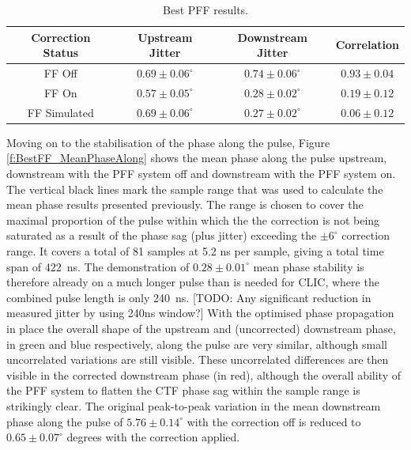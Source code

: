 \begin{table}
  \begin{center}
    \begin{tabular}{| c | c | c | c |}
	   \hline
       Correction Status & Upstream Jitter & Downstream Jitter & Correlation \\ \hline
       FF Off & \(0.69\pm0.06^\circ\) & \(0.74\pm0.06^\circ\) & \(0.93\pm0.04\) \\
	   FF On & \(0.57\pm0.05^\circ\) & \(0.28\pm0.02^\circ\) & \(0.19\pm0.12\) \\
	   FF Simulated & \(0.69\pm0.06^\circ\) & \(0.27\pm0.02^\circ\) & \(0.06\pm0.12\) \\ \hline
    \end{tabular}
    \caption{Best PFF results.}
  	\label{t:BestFF}
  \end{center}
\end{table}

Moving on to the stabilisation of the phase along the pulse, Figure \ref{f:BestFF_MeanPhaseAlong} shows the mean phase along the pulse upstream, downstream with the PFF system off and downstream with the PFF system on. The vertical black lines mark the sample range that was used to calculate the mean phase results presented previously. The range is chosen to cover the maximal proportion of the pulse within which the the correction is not being saturated as a result of the phase sag (plus jitter) exceeding the \(\pm6^\circ\) correction range. It covers a total of 81 samples at 5.2 ns per sample, giving a total time span of 422~ns. The demonstration of \(0.28\pm0.01^\circ\) mean phase stability is therefore already on a much longer pulse than is needed for CLIC, where the combined pulse length is only 240~ns. [TODO: Any significant reduction in measured jitter by using 240ns window?] With the optimised phase propagation in place the overall shape of the upstream and (uncorrected) downstream phase, in green and blue respectively, along the pulse are very similar, although small uncorrelated variations are still visible. These uncorrelated differences are then visible in the corrected downstream phase (in red), although the overall ability of the PFF system to flatten the CTF phase sag within the sample range is strikingly clear. The original peak-to-peak variation in the mean downstream phase along the pulse of \(5.76\pm0.14^\circ\) with the correction off is reduced to \(0.65\pm0.07^\circ\) degrees with the correction applied.

